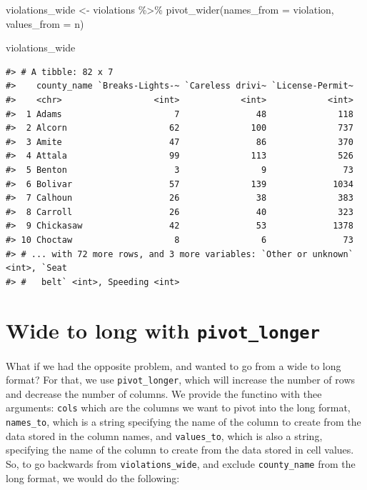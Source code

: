 \documentclass[
]{book}
\newenvironment{Shaded}{\begin{snugshade}}{\end{snugshade}}
\newcommand{\AttributeTok}[1]{\textcolor[rgb]{0.77,0.63,0.00}{#1}}
\newcommand{\FunctionTok}[1]{\textcolor[rgb]{0.00,0.00,0.00}{#1}}
\newcommand{\NormalTok}[1]{#1}
\newcommand{\OtherTok}[1]{\textcolor[rgb]{0.56,0.35,0.01}{#1}}
\newcommand{\SpecialCharTok}[1]{\textcolor[rgb]{0.00,0.00,0.00}{#1}}
\begin{document}
\begin{Shaded}
\begin{Highlighting}[]
\NormalTok{violations\_wide }\OtherTok{\textless{}{-}}\NormalTok{ violations }\SpecialCharTok{\%\textgreater{}\%}
  \FunctionTok{pivot\_wider}\NormalTok{(}\AttributeTok{names\_from =}\NormalTok{ violation, }
              \AttributeTok{values\_from =}\NormalTok{ n) }

\NormalTok{violations\_wide}
\end{Highlighting}
\end{Shaded}

\begin{verbatim}
#> # A tibble: 82 x 7
#>    county_name `Breaks-Lights-~ `Careless drivi~ `License-Permit~
#>    <chr>                  <int>            <int>            <int>
#>  1 Adams                      7               48              118
#>  2 Alcorn                    62              100              737
#>  3 Amite                     47               86              370
#>  4 Attala                    99              113              526
#>  5 Benton                     3                9               73
#>  6 Bolivar                   57              139             1034
#>  7 Calhoun                   26               38              383
#>  8 Carroll                   26               40              323
#>  9 Chickasaw                 42               53             1378
#> 10 Choctaw                    8                6               73
#> # ... with 72 more rows, and 3 more variables: `Other or unknown` <int>, `Seat
#> #   belt` <int>, Speeding <int>
\end{verbatim}

\hypertarget{wide-to-long-with-pivot_longer}{%
\section{\texorpdfstring{Wide to long with \texttt{pivot\_longer}}{Wide to long with pivot\_longer}}\label{wide-to-long-with-pivot_longer}}

What if we had the opposite problem, and wanted to go from a wide to long
format? For that, we use \texttt{pivot\_longer}, which will increase the number of rows and decrease the number of columns. We provide the functino with thee arguments: \texttt{cols} which are the columns we want to pivot into the long format, \texttt{names\_to}, which is a string specifying the name of the column to create from the data stored in the column names, and \texttt{values\_to}, which is also a string, specifying the name of the column to create from the data stored in cell values.
So, to go backwards from \texttt{violations\_wide}, and exclude \texttt{county\_name} from the long format, we would do the following:
\end{document}
